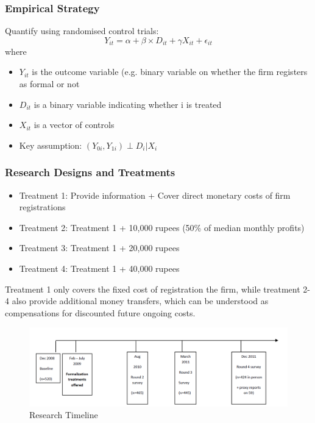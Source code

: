         
        \subsubsection{Empirical Strategy}
       Quantify using randomised control trials:
$$Y_{it}= \alpha+ \beta \times D_{it} + \gamma X_{it} + \epsilon_{it}$$
where
        \begin{itemize}
        \item $Y_{it}$ is the outcome variable (e.g. binary variable on whether the firm registers as formal or not
        \item $D_{it}$ is a binary variable indicating whether i is treated
        \item $X_{it}$ is a vector of controls
        \item Key assumption: $(Y_{0i}, Y_{1i}) \perp D_i|X_i$
        \end{itemize}
        
        \subsubsection{Research Designs and Treatments}
            \begin{itemize}
                \item Treatment 1: Provide information + Cover direct monetary costs of firm registrations
                \item Treatment 2: Treatment 1 + 10,000 rupees (50\% of median monthly profits)
                \item Treatment 3: Treatment 1 + 20,000 rupees
                \item Treatment 4: Treatment 1 + 40,000 rupees
            \end{itemize}
            Treatment 1 only covers the fixed cost of registration the firm, while treatment 2-4 also provide additional money transfers, which can be understood as compensations for discounted future ongoing costs.
            \begin{figure}[H]
                \centering
                \includegraphics[width=5.5in]{images/ch5/SL formal treatment 1.png}
                \caption{Research Timeline}
            \end{figure}

